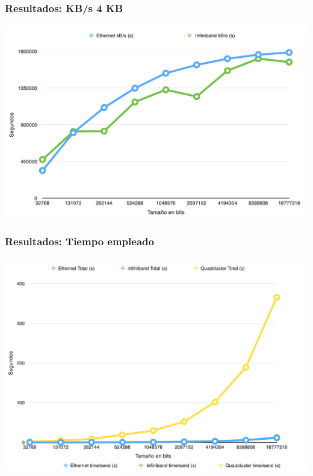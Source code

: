 \documentclass[10pt]{beamer}
\begin{document}
\begin{frame}[fragile]
\frametitle{Resultados: KB/s 4 KB}
\begin{center}
\includegraphics[scale=0.42]{3.png}
\end{center}
\end{frame}
\begin{frame}[fragile]
\frametitle{Resultados: Tiempo empleado }
\begin{center}
\includegraphics[scale=0.42]{4.png}
\end{center}
\end{frame}
\end{document}
